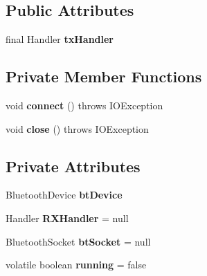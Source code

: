 \subsection*{Public Attributes}
\begin{DoxyCompactItemize}
\item 
final Handler {\bfseries tx\+Handler}
\end{DoxyCompactItemize}
\subsection*{Private Member Functions}
\begin{DoxyCompactItemize}
\item 
\mbox{\label{classcom_1_1jack_1_1motorbikestatistics_1_1_b_t_connection_a4c1b8ebff8a40a9cddd77a55b59b45af}} 
void {\bfseries connect} ()  throws I\+O\+Exception 
\item 
\mbox{\label{classcom_1_1jack_1_1motorbikestatistics_1_1_b_t_connection_ac1cd0e85a758db424a57010ac9bb87f0}} 
void {\bfseries close} ()  throws I\+O\+Exception 
\end{DoxyCompactItemize}
\subsection*{Private Attributes}
\begin{DoxyCompactItemize}
\item 
\mbox{\label{classcom_1_1jack_1_1motorbikestatistics_1_1_b_t_connection_af49e78cef4253d96f009a9a1473e038d}} 
Bluetooth\+Device {\bfseries bt\+Device}
\item 
\mbox{\label{classcom_1_1jack_1_1motorbikestatistics_1_1_b_t_connection_a64fc7b02a2b9f052c6b05842b79b3cdc}} 
Handler {\bfseries R\+X\+Handler} = null
\item 
\mbox{\label{classcom_1_1jack_1_1motorbikestatistics_1_1_b_t_connection_a0d47f94a35f7c8a07429975446e7b33b}} 
Bluetooth\+Socket {\bfseries bt\+Socket} = null
\item 
\mbox{\label{classcom_1_1jack_1_1motorbikestatistics_1_1_b_t_connection_a6193b7b92b7f2905a3a43d63db40aba8}} 
volatile boolean {\bfseries running} = false
\end{DoxyCompactItemize}
